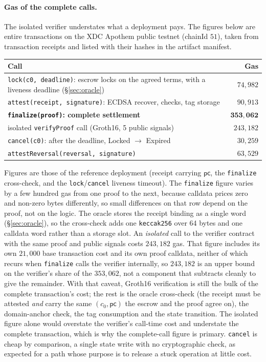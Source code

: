 \documentclass[11pt]{article}
\newcommand{\code}[1]{\texttt{#1}}
\begin{document}
\paragraph{Gas of the complete calls.}
The isolated verifier understates what a deployment pays. The figures below
are entire transactions on the XDC Apothem public testnet (chainId $51$), taken
from transaction receipts and listed with their hashes in the artifact
manifest.

\begin{center}
\small
\begin{tabular}{@{}lr@{}}
\toprule
\textbf{Call} & \textbf{Gas} \\
\midrule
\code{lock(c0, deadline)}: escrow locks on the agreed terms, with a liveness deadline (\S\ref{sec:oracle}) & $74{,}982$ \\
\code{attest(receipt, signature)}: ECDSA recover, checks, tag storage & $90{,}913$ \\
\textbf{\code{finalize(proof)}: complete settlement} & $\mathbf{353{,}062}$ \\
\quad isolated \code{verifyProof} call (Groth16, 5 public signals) & $243{,}182$ \\
\code{cancel(c0)}: after the deadline, Locked $\to$ Expired & $30{,}259$ \\
\code{attestReversal(reversal, signature)} & $63{,}529$ \\
\bottomrule
\end{tabular}
\end{center}

\noindent Figures are those of the reference deployment (receipt carrying
$\mathsf{pc}$, the \code{finalize} cross-check, and the \code{lock}/\code{cancel}
liveness timeout). The \code{finalize} figure varies by a few hundred gas from
one proof to the next, because calldata prices zero and non-zero bytes
differently, so small differences on that row depend on the proof, not on the
logic. The oracle stores the receipt binding as a single word
(\S\ref{sec:oracle}), so the cross-check adds one \code{keccak256} over 64 bytes
and one calldata word rather than a storage slot. An \emph{isolated} call to
the verifier contract with the same proof and public signals costs
$243{,}182$ gas. That figure includes its own $21{,}000$ base transaction cost
and its own proof calldata, neither of which recurs when \code{finalize} calls
the verifier internally, so $243{,}182$ is an upper bound on the verifier's
share of the $353{,}062$, not a component that subtracts cleanly to give the
remainder. With that caveat, Groth16 verification is still the bulk of the
complete transaction's cost; the rest is the oracle cross-check (the receipt
must be attested \emph{and} carry the same $(c_0,\mathsf{pc})$ the escrow and
the proof agree on), the domain-anchor check, the tag consumption and the state
transition. The isolated figure alone would overstate the verifier's call-time
cost and understate the complete transaction, which is why the complete-call
figure is primary. \code{cancel} is cheap by comparison, a single state write
with no cryptographic check, as expected for a path whose purpose is to release
a stuck operation at little cost.
\end{document}
